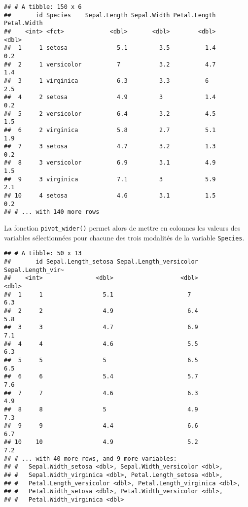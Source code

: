 \documentclass[
  french,
]{book}
\newenvironment{Shaded}{\begin{snugshade}}{\end{snugshade}}
\newcommand{\DataTypeTok}[1]{\textcolor[rgb]{0.13,0.29,0.53}{#1}}
\newcommand{\KeywordTok}[1]{\textcolor[rgb]{0.13,0.29,0.53}{\textbf{#1}}}
\newcommand{\NormalTok}[1]{#1}
\newcommand{\OperatorTok}[1]{\textcolor[rgb]{0.81,0.36,0.00}{\textbf{#1}}}
\newcommand{\StringTok}[1]{\textcolor[rgb]{0.31,0.60,0.02}{#1}}
\begin{document}
\begin{verbatim}
## # A tibble: 150 x 6
##       id Species    Sepal.Length Sepal.Width Petal.Length Petal.Width
##    <int> <fct>             <dbl>       <dbl>        <dbl>       <dbl>
##  1     1 setosa              5.1         3.5          1.4         0.2
##  2     1 versicolor          7           3.2          4.7         1.4
##  3     1 virginica           6.3         3.3          6           2.5
##  4     2 setosa              4.9         3            1.4         0.2
##  5     2 versicolor          6.4         3.2          4.5         1.5
##  6     2 virginica           5.8         2.7          5.1         1.9
##  7     3 setosa              4.7         3.2          1.3         0.2
##  8     3 versicolor          6.9         3.1          4.9         1.5
##  9     3 virginica           7.1         3            5.9         2.1
## 10     4 setosa              4.6         3.1          1.5         0.2
## # ... with 140 more rows
\end{verbatim}

La fonction \texttt{pivot\_wider()} permet alors de mettre en colonnes les valeurs des variables sélectionnées pour chacune des trois modalités de la variable \texttt{Species}.

\begin{Shaded}
\end{Shaded}

\begin{verbatim}
## # A tibble: 50 x 13
##       id Sepal.Length_setosa Sepal.Length_versicolor Sepal.Length_vir~
##    <int>               <dbl>                   <dbl>             <dbl>
##  1     1                 5.1                     7                 6.3
##  2     2                 4.9                     6.4               5.8
##  3     3                 4.7                     6.9               7.1
##  4     4                 4.6                     5.5               6.3
##  5     5                 5                       6.5               6.5
##  6     6                 5.4                     5.7               7.6
##  7     7                 4.6                     6.3               4.9
##  8     8                 5                       4.9               7.3
##  9     9                 4.4                     6.6               6.7
## 10    10                 4.9                     5.2               7.2
## # ... with 40 more rows, and 9 more variables:
## #   Sepal.Width_setosa <dbl>, Sepal.Width_versicolor <dbl>,
## #   Sepal.Width_virginica <dbl>, Petal.Length_setosa <dbl>,
## #   Petal.Length_versicolor <dbl>, Petal.Length_virginica <dbl>,
## #   Petal.Width_setosa <dbl>, Petal.Width_versicolor <dbl>,
## #   Petal.Width_virginica <dbl>
\end{verbatim}
\end{document}
